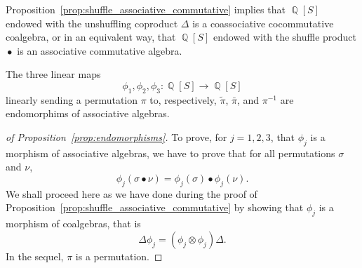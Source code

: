 \documentclass[a4paper]{llncs}
\DeclareMathOperator{\QQ}{\mathbb{Q}}
\DeclareMathOperator{\SHUFFLE}{\bullet}
\begin{document}
Proposition~\ref{prop:shuffle_associative_commutative} implies that
$\QQ[S]$ endowed with the unshuffling coproduct $\Delta$ is a
coassociative cocommutative coalgebra, or in an equivalent way, that
$\QQ[S]$ endowed with the shuffle product $\SHUFFLE$ is an associative
commutative algebra.
\medskip

\begin{proposition} \label{prop:endomorphisms}
    The three linear maps
    \begin{equation}
        \phi_1, \phi_2, \phi_3 : \QQ[S] \to \QQ[S]
    \end{equation}
    linearly sending a permutation $\pi$ to, respectively,
    $\widetilde{\pi}$, $\bar \pi$, and $\pi^{-1}$ are endomorphims of
    associative algebras.
\end{proposition}
\begin{proof}[of Proposition~\ref{prop:endomorphisms}]
    To prove, for $j = 1, 2, 3$, that $\phi_j$ is a morphism of
    associative algebras, we have to prove that for all permutations
    $\sigma$ and $\nu$,
    \begin{equation}
        \phi_j(\sigma \SHUFFLE \nu) =
        \phi_j(\sigma) \SHUFFLE \phi_j(\nu).
    \end{equation}
    We shall proceed here as we have done during the proof of
    Proposition~\ref{prop:shuffle_associative_commutative} by showing
    that $\phi_j$ is a morphism of coalgebras, that is
    \begin{equation}
        \Delta \phi_j = (\phi_j \otimes \phi_j) \Delta.
    \end{equation}
    In the sequel, $\pi$ is a permutation.
    \smallskip


\end{proof}
\end{document}
